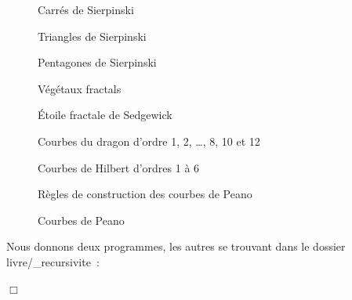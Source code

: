 \begin{figure}[htbp]
 \caption{Carrés de Sierpinski}\label{fig:carsierp}
\end{figure}
\begin{figure}[htbp]
 \caption{Triangles de Sierpinski}\label{fig:trisierp}
\end{figure}
\begin{figure}[htbp]
 \caption{Pentagones de Sierpinski}\label{fig:pensierp}
\end{figure}
\begin{figure}[htbp]
 \caption{Végétaux fractals}\label{fig:vege}
\end{figure}
\begin{figure}[htbp]
 \caption{Étoile fractale de Sedgewick}\label{fig:sedgew}
\end{figure}
\begin{figure}[htbp]
 \caption{Courbes du dragon d'ordre 1, 2, \ldots, 8, 10 et 12}\label{fig:dragon}
\end{figure}
\begin{figure}[htbp]
 \caption{Courbes de Hilbert d'ordres 1 à 6}\label{fig:hilbert}
\end{figure}
\begin{figure}[htbp]
 \caption{Règles de construction des courbes de Peano}\label{fig:conspeano}
\end{figure}
\begin{figure}[htbp]
 \caption{Courbes de Peano}\label{fig:peano}
\end{figure}
\pagebreak[3]
\begin{corriges}{
\renewcommand{\carrenoir}{\hspace{-4mm}\rule{1.5mm}{1.5mm}\hspace{2.5mm}}
Nous donnons deux programmes, les autres se trouvant dans le dossier {\idt livre/\_recursivite}~:
\label{prog:SegmentDeVonKoch}

\pagebreak[3]

\renewcommand{\carrenoir}{}
\noindent $\Box$}\end{corriges}
\vfill

